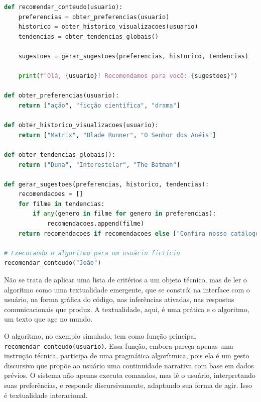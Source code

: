 \documentclass[portuguese]{textolivre}
\begin{document}
\begin{lstlisting}[language=Python, label=fig3, caption={Exemplo de Algoritmo: recomendação em plataformas de \textit{streaming}.}, source={Elaborado pelo autor via simulação por IA.}]
def recomendar_conteudo(usuario):
    preferencias = obter_preferencias(usuario)
    historico = obter_historico_visualizacoes(usuario)
    tendencias = obter_tendencias_globais()

    sugestoes = gerar_sugestoes(preferencias, historico, tendencias)

    print(f"Olá, {usuario}! Recomendamos para você: {sugestoes}")

def obter_preferencias(usuario):
    return ["ação", "ficção científica", "drama"]

def obter_historico_visualizacoes(usuario):
    return ["Matrix", "Blade Runner", "O Senhor dos Anéis"]

def obter_tendencias_globais():
    return ["Duna", "Interestelar", "The Batman"]

def gerar_sugestoes(preferencias, historico, tendencias):
    recomendacoes = []
    for filme in tendencias:
        if any(genero in filme for genero in preferencias): 
            recomendacoes.append(filme)
    return recomendacoes if recomendacoes else ["Confira nosso catálogo!"]

# Executando o algoritmo para um usuário fictício
recomendar_conteudo("João")
\end{lstlisting}

Não se trata de aplicar uma lista de critérios a um objeto técnico, mas de ler o algoritmo como uma textualidade emergente, que se constrói na interface com o usuário, na forma gráfica do código, nas inferências ativadas, nas respostas comunicacionais que produz. A textualidade, aqui, é uma prática e o algoritmo, um texto que age no mundo.

O algoritmo, no exemplo simulado, tem como função principal \lstinline[language=Python]{recomendar_conteudo(usuario)}. Essa função, embora pareça apenas uma instrução técnica, participa de uma pragmática algorítmica, pois ela é um gesto discursivo que propõe ao usuário uma continuidade narrativa com base em dados prévios. O sistema não apenas executa comandos, mas lê o usuário, interpretando suas preferências, e responde discursivamente, adaptando sua forma de agir. Isso é textualidade interacional.
\end{document}
